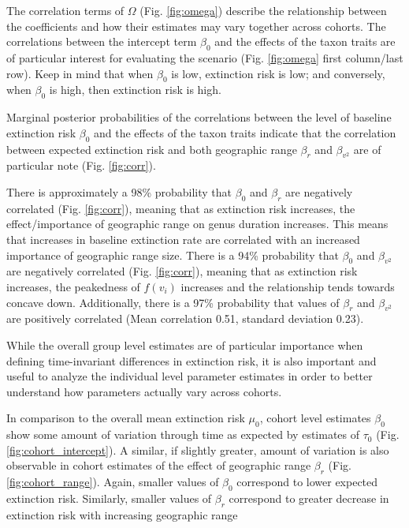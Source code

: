 \documentclass[12pt,letterpaper]{article}
\begin{document}
The correlation terms of \(\Omega\) (Fig. \ref{fig:omega}) describe the relationship between the coefficients and how their estimates may vary together across cohorts. The correlations between the intercept term \(\beta_{0}\) and the effects of the taxon traits are of particular interest for evaluating the \citet{Jablonski1986} scenario (Fig. \ref{fig:omega} first column/last row). Keep in mind that when \(\beta_{0}\) is low, extinction risk is low; and conversely, when \(\beta_{0}\) is high, then extinction risk is high.

Marginal posterior probabilities of the correlations between the level of baseline extinction risk \(\beta_{0}\) and the effects of the taxon traits indicate that the correlation between expected extinction risk and both geographic range \(\beta_{r}\) and \(\beta_{v^{2}}\) are of particular note (Fig. \ref{fig:corr}). 

There is approximately a 98\% probability that \(\beta_{0}\) and \(\beta_{r}\) are negatively correlated (Fig. \ref{fig:corr}), meaning that as extinction risk increases, the effect/importance of geographic range on genus duration increases. This means that increases in baseline extinction rate are correlated with an increased importance of geographic range size. There is a 94\% probability that \(\beta_{0}\) and \(\beta_{v^{2}}\) are negatively correlated (Fig. \ref{fig:corr}), meaning that as extinction risk increases, the peakedness of \(f(v_{i})\) increases and the relationship tends towards concave down. Additionally, there is a 97\% probability that values of \(\beta_{r}\) and \(\beta_{v^{2}}\) are positively correlated (Mean correlation 0.51, standard deviation 0.23).

While the overall group level estimates are of particular importance when defining time-invariant differences in extinction risk, it is also important and useful to analyze the individual level parameter estimates in order to better understand how parameters actually vary across cohorts.

In comparison to the overall mean extinction risk \(\mu_{0}\), cohort level estimates \(\beta_{0}\) show some amount of variation through time as expected by estimates of \(\tau_{0}\) (Fig. \ref{fig:cohort_intercept}). A similar, if slightly greater, amount of variation is also observable in cohort estimates of the effect of geographic range \(\beta_{r}\) (Fig. \ref{fig:cohort_range}). Again, smaller values of \(\beta_{0}\) correspond to lower expected extinction risk. Similarly, smaller values of \(\beta_{r}\) correspond to greater decrease in extinction risk with increasing geographic range 
\end{document}
